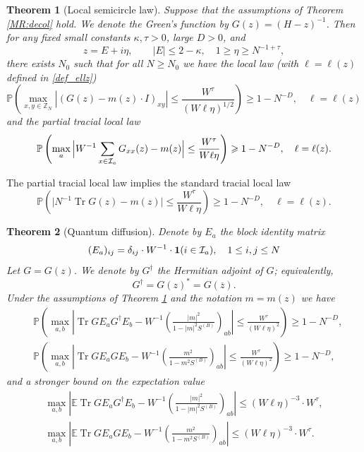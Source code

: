 \documentclass[10pt,reqno]{article}
\DeclareMathOperator{\tr}{Tr}
\theoremstyle{plain} %
\newtheorem{theorem}{Theorem}[section]
\theoremstyle{remark}
\numberwithin{equation}{section}
\begin{document}
 
\begin{theorem}[Local semicircle law]\label{MR:locSC} Suppose that  the assumptions of Theorem \ref{MR:decol} hold. We denote the Green's function by 
$ G(z)=(H-z)^{-1}$. 
Then for 
 any fixed small constants $\kappa, \tau>0$, large $D>0$, and 
$$z=E+i\eta,\quad\quad |E|\le  2-\kappa, \quad 1\ge \eta\ge N^{-1+\tau},
$$
there exists $N_0$ such that for all $N \geqslant N_0$  we have the  local law (with $\ell=\ell(z)$ defined in \eqref{def_ellz})
\begin{equation}\label{G_bound}
   \mathbb P\left( \max_{x,y\in \mathbb Z_N}  \left|\left(G(z)-m(z)\cdot I\right)_{xy}\right|\le  \frac{W^\tau}{(W\ell\eta)^{ 1/2}}\right)\geqslant 1-N^{-D},\quad \ell=\ell(z) 
\end{equation}
and the partial   tracial  local law
\begin{equation}\label{G_bound_ave}
\mathbb{P}\left(\max_a\Big| W^{-1}\sum_{x\in {\cal I}_a}G_{xx}(z)-m(z) \Big| \le \frac{W^\tau}{W\ell\eta} \right)\geqslant 1-N^{-D},\quad \ell=\ell(z). 
\end{equation}

\end{theorem}
The partial tracial  local law implies  the standard tracial local law 
 $$
\mathbb{P}\left(\Big| N^{-1}\tr G(z)-m(z) \Big| \le \frac{W^\tau}{W\ell\eta}  \right)\geqslant 1-N^{-D},\quad \ell=\ell(z) . 
$$




\begin{theorem}[Quantum diffusion]\label{MR:QDiff}
Denote by  $E_a$ the  block identity matrix 
\begin{equation}\label{Def_matE}
(E_a)_{ij}=  \delta_{ij}\cdot W^{-1}\cdot\textbf{1}(i\in {\cal I}_a),\quad 1\le i,j\le N
\end{equation}
Let \(G=G(z)\). We denote by \(G^\dagger\) the Hermitian adjoint of \(G\);
equivalently,
\[
    G^\dagger = G(z)^* = G(\overline z).
\]
Under the assumptions of Theorem \ref{MR:locSC} and the notation $m=m(z)$ we have 
 \begin{align}\label{Meq:QdW1}
 &
 \mathbb P\left(\max_{a,b }   \left|\tr G E_a G^\dagger E_b- W^{-1}\left(\frac{|m|^2}{1-|m|^2 S^{(B)}} \right)_{ab}\right|\le\frac{W^\tau}{ \left(W \ell\eta\right)^{ 2}}\right)\ge 1-N^{-D},
 \\ \label{Meq:QdW2}
 &
 \mathbb P\left( \max_{a,b }   \left|\tr G E_a G  E_b- W^{-1}\left(\frac{m^2}{1-m^2 S^{(B)}} \right)_{ab}\right|\le\frac{W^\tau}{ \left(W \ell\eta\right)^{ 2}}\right)\ge 1-N^{-D},
\end{align}
and a stronger bound on the expectation value 
\begin{align}\label{Meq:QdS1}
 \max_{a,b }   \left|\mathbb E\tr G E_a G^\dagger E_b- W^{-1}\left(\frac{|m|^2}{1-|m|^2 S^{(B)}} \right)_{ab}\right|\le  \left(W \ell\eta\right)^{-3} \cdot W^\tau,   \\
 \label{Meq:QdS2}
 \max_{a,b }   \left|\mathbb E\tr G E_a G  E_b- W^{-1}\left(\frac{m^2}{1-m^2 S^{(B)}} \right)_{ab}\right|\le \left(W \ell\eta\right)^{-3} \cdot W^\tau   .
\end{align}
 
\end{theorem}
\end{document}
